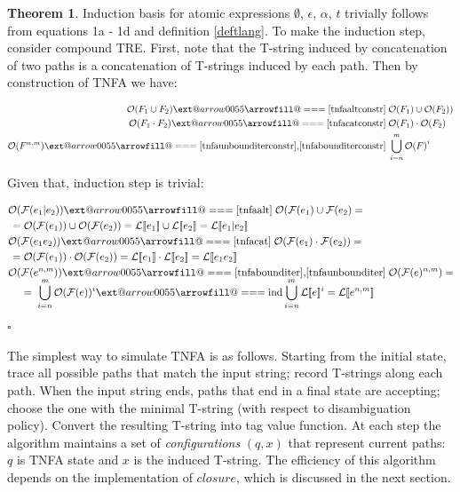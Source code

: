 \documentclass{article}
\makeatletter
\newcommand{\Xeq}{\!=\!}
\newcommand{\Xlb}{[\![}
\newcommand{\Xrb}{]\!]}
\newcommand{\Xmap}{\!\mapsto\!}
\newcommand{\XF}{\mathcal{F}}
\newcommand{\XL}{\mathcal{L}}
\newcommand{\XO}{\mathcal{O}}
\newcommand*{\Relbarfill@}{\arrowfill@\Relbar\Relbar\Relbar}
\newcommand*{\Xlongeq}[2][]{\ext@arrow 0055\Relbarfill@{#1}{\text{#2}}}
\theoremstyle{definition}
\newtheorem{XThe}{Theorem}
\makeatother
\begin{document}
\begin{multicols}{2}
\begin{XThe}
Induction basis for atomic expressions $\emptyset$, $\epsilon$, $\alpha$, $t$
trivially follows from equations 1a - 1d and definition \ref{deftlang}.
To make the induction step, consider compound TRE.
First, note that the T-string induced by concatenation of two paths
is a concatenation of T-strings induced by each path.
Then by construction of TNFA we have:

    \begin{align*}
        \XO(F_1 \cup F_2) \Xlongeq{\ref{tnfaaltconstr}}&\; \XO(F_1) \cup \XO(F_2)) \\
        \XO(F_1 \cdot F_2) \Xlongeq{\ref{tnfacatconstr}}&\; \XO(F_1) \cdot \XO(F_2) \\
        \XO(F^{n,m}) \Xlongeq{\ref{tnfaunbounditerconstr},\ref{tnfabounditerconstr}}&\; \bigcup_{i=n}^m {\XO(F)}^i
    \end{align*}

Given that, induction step is trivial:

    \begin{align*}
        \XO(&\XF(e_1 | e_2)) \Xlongeq{\ref{tnfaalt}} \;
            \XO(\XF(e_1) \cup \XF(e_2) = \\
        =&\; \XO(\XF(e_1)) \cup \XO(\XF(e_2)) = 
            \XL \Xlb e_1 \Xrb \cup \XL \Xlb e_2 \Xrb
            = \XL \Xlb e_1 | e_2 \Xrb \\
%
        \XO(&\XF(e_1 e_2)) \Xlongeq{\ref{tnfacat}} \; \XO(\XF(e_1) \cdot \XF(e_2)) = \\
        =&\; \XO(\XF(e_1)) \cdot \XO(\XF(e_2)) =
            \XL \Xlb e_1 \Xrb \cdot \XL \Xlb e_2 \Xrb = \XL \Xlb e_1 e_2 \Xrb \\
%
        \XO(&\XF(e^{n,m})) \Xlongeq{\ref{tnfabounditer},\ref{tnfaunbounditer}} \; \XO(\XF(e)^{n,m}) = \\[-0.5em]
            &=\; \bigcup\limits_{i=n}^m \XO(\XF(e))^i
        \Xlongeq{ind} \bigcup\limits_{i=n}^m \XL\Xlb e \Xrb^i
            = \XL \Xlb e^{n,m} \Xrb
    \end{align*}
    $\square$
    \end{XThe}

The simplest way to simulate TNFA is as follows.
Starting from the initial state, trace all possible paths that match the input string; record T-strings along each path.
When the input string ends, paths that end in a final state are accepting;
choose the one with the minimal T-string (with respect to disambiguation policy).
Convert the resulting T-string into tag value function.
At each step the algorithm maintains a set of \emph{configurations} $(q, x)$ that represent current paths:
$q$ is TNFA state and $x$ is the induced T-string.
The efficiency of this algorithm depends on the implementation of $closure$, which is discussed in the next section.
\\


\end{multicols}
\end{document}
